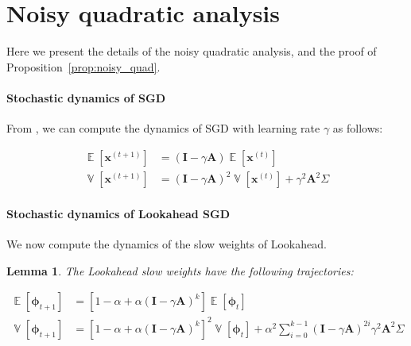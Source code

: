 \documentclass{article}
\newcommand{\bx}{\mathbf{x}}
\newcommand{\bA}{\mathbf{A}}
\newcommand{\bI}{\mathbf{I}}
\newcommand{\E}{\mathop{\mathbb{E}}}
\newcommand{\V}{\mathop{\mathbb{V}}}
\newcommand{\bphi}{\boldsymbol{\phi}} \newif\ifcomments
\newtheorem{lemma}{Lemma}
\begin{document}
\appendix
\section{Noisy quadratic analysis}
\label{app:noisy}
Here we present the details of the noisy quadratic analysis, and the proof of Proposition~\ref{prop:noisy_quad}.

\paragraph{Stochastic dynamics of SGD} From \citet{wu2018understanding}, we can compute the dynamics of SGD with learning rate $\gamma$ as follows:

\begin{align}
    \E[\bx^{(t+1)}] &= (\bI - \gamma \bA) \E[\bx^{(t)}] \\
    \V[\bx^{(t+1)}] &= (\bI - \gamma \bA)^2\V[\bx^{(t)}] + \gamma^2 \bA^2 \Sigma
\end{align}

\paragraph{Stochastic dynamics of Lookahead SGD} We now compute the dynamics of the slow weights of Lookahead.

\begin{lemma}The Lookahead slow weights have the following trajectories:

\begin{align}
    \E[\bphi_{t+1}] &= [1 - \alpha + \alpha (\bI - \gamma \bA)^k] \E[\bphi_{t}] \\
    \V[\bphi_{t+1}] &= [1-\alpha + \alpha (\bI - \gamma \bA)^k]^2\V[\bphi_t] + \alpha^2 \sum_{i=0}^{k-1} (\bI - \gamma \bA)^{2i}\gamma^2\bA^2\Sigma 
\end{align}
\end{lemma}
\end{document}
